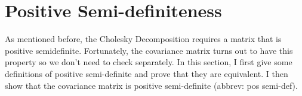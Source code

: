 \documentclass{article}
\begin{document}
\section{Positive Semi-definiteness}
As mentioned before, the Cholesky Decomposition requires a matrix that is positive semidefinite. Fortunately, the covariance matrix turns out to have this property so we don't need to check separately. 
In this section, I first give some definitions of positive semi-definite and prove that they are equivalent. 
\newline
I then show that the covariance matrix is positive semi-definite (abbrev: pos semi-def). 
\end{document}
